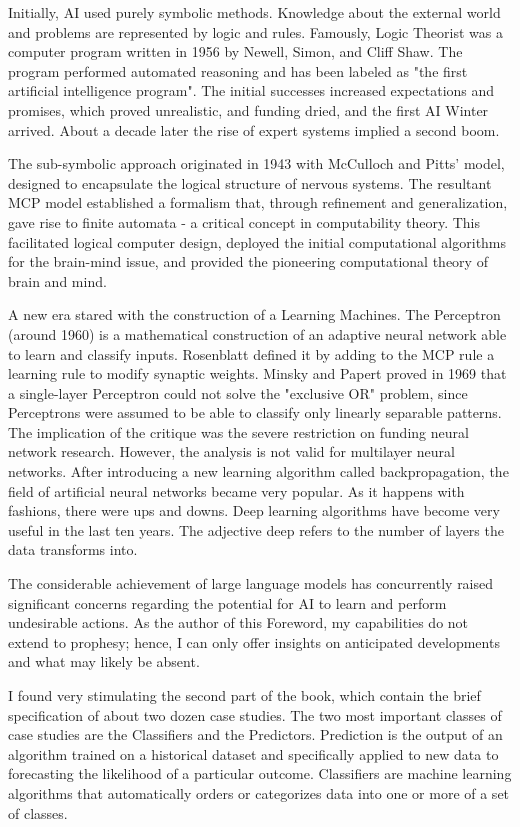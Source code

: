 Initially, AI used purely symbolic methods. Knowledge about the external world and problems are represented by logic and rules. Famously, Logic Theorist was a computer program written in 1956 by Newell, Simon, and Cliff Shaw. The program performed automated reasoning and has been labeled as "the first artificial intelligence program". The initial successes increased expectations and promises, which proved unrealistic, and funding dried, and the first AI Winter arrived. About a decade later the rise of expert systems implied a second boom.

The sub-symbolic approach originated in 1943 with McCulloch and Pitts' model, designed to encapsulate the logical structure of nervous systems. The resultant MCP model established a formalism that, through refinement and generalization, gave rise to finite automata - a critical concept in computability theory. This facilitated logical computer design, deployed the initial computational algorithms for the brain-mind issue, and provided the pioneering computational theory of brain and mind.

A new era stared with the construction of a Learning Machines. The Perceptron (around 1960) is a mathematical construction of an adaptive neural network able to learn and classify inputs. Rosenblatt defined it by adding to the MCP rule a learning rule to modify synaptic weights. Minsky and Papert proved in 1969 that a single-layer Perceptron could not solve the "exclusive OR" problem, since Perceptrons were assumed to be able to classify only linearly separable patterns. The implication of the critique was the severe restriction on funding neural network research. However, the analysis is not valid for multilayer neural networks. After introducing a new learning algorithm called backpropagation, the field of artificial neural networks became very popular. As it happens with fashions, there were ups and downs. Deep learning algorithms have become very useful in the last ten years. The adjective deep refers to the number of layers the data transforms into. 

The considerable achievement of large language models has concurrently raised significant concerns regarding the potential for AI to learn and perform undesirable actions. As the author of this Foreword, my capabilities do not extend to prophesy; hence, I can only offer insights on anticipated developments and what may likely be absent.

I found very stimulating the second part of the book, which contain the brief specification of about two dozen case studies. The two most important classes of case studies are the Classifiers and the Predictors. Prediction is the output of an algorithm trained on a historical dataset and specifically applied to new data to  forecasting the likelihood of a particular outcome. Classifiers are machine learning algorithms that automatically orders or categorizes data into one or more of a set of classes.


